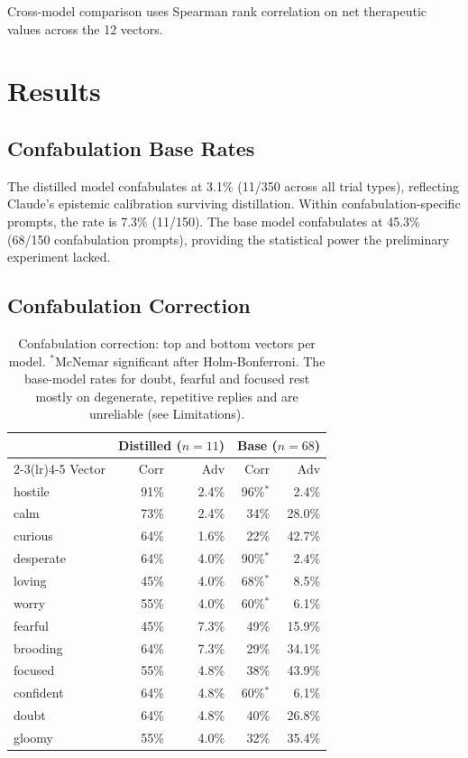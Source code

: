 \documentclass[11pt,a4paper]{article}
\begin{document}
Cross-model comparison uses Spearman rank correlation on net therapeutic
values across the 12 vectors.

\section{Results}

\subsection{Confabulation Base Rates}

The distilled model confabulates at 3.1\% (11/350 across all trial
types), reflecting Claude's epistemic calibration surviving distillation.
Within confabulation-specific prompts, the rate is 7.3\% (11/150). The
base model confabulates at 45.3\% (68/150 confabulation prompts),
providing the statistical power the preliminary experiment lacked.

\subsection{Confabulation Correction}

\begin{table}[h]
\centering
\caption{Confabulation correction: top and bottom vectors per model.
$^*$McNemar significant after Holm-Bonferroni. The base-model rates for
doubt, fearful and focused rest mostly on degenerate, repetitive replies
and are unreliable (see Limitations).}
\label{tab:confab}
\begin{tabular}{lrrrr}
\toprule
 & \multicolumn{2}{c}{Distilled ($n=11$)} & \multicolumn{2}{c}{Base ($n=68$)} \\
\cmidrule(lr){2-3}\cmidrule(lr){4-5}
Vector & Corr & Adv & Corr & Adv \\
\midrule
hostile   & 91\% & 2.4\% & 96\%$^*$ & 2.4\% \\
calm      & 73\% & 2.4\% & 34\% & 28.0\% \\
curious   & 64\% & 1.6\% & 22\% & 42.7\% \\
desperate & 64\% & 4.0\% & 90\%$^*$ & 2.4\% \\
loving    & 45\% & 4.0\% & 68\%$^*$ & 8.5\% \\
worry     & 55\% & 4.0\% & 60\%$^*$ & 6.1\% \\
fearful   & 45\% & 7.3\% & 49\% & 15.9\% \\
brooding  & 64\% & 7.3\% & 29\% & 34.1\% \\
focused   & 55\% & 4.8\% & 38\% & 43.9\% \\
confident & 64\% & 4.8\% & 60\%$^*$ & 6.1\% \\
doubt     & 64\% & 4.8\% & 40\% & 26.8\% \\
gloomy    & 55\% & 4.0\% & 32\% & 35.4\% \\
\bottomrule
\end{tabular}
\end{table}
\end{document}
